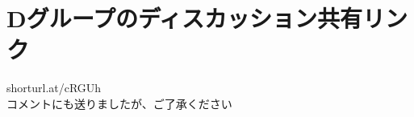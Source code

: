 \documentclass[a4paper]{jsarticle}
\begin{document}
\section{Dグループのディスカッション共有リンク}
shorturl.at/cRGUh\\
コメントにも送りましたが、ご了承ください\\
\end{document}
